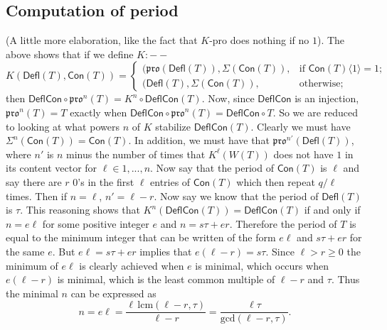 \documentclass[12pt]{amsart}
\theoremstyle{definition}
\theoremstyle{remark}
\numberwithin{equation}{section}
\newcommand{\pro}{\mathfrak{pro}}
\newcommand{\deflate}{\ensuremath{\mathsf{Defl}}}
\newcommand{\content}{\ensuremath{\mathsf{Con}}}
\newcommand{\compress}{\ensuremath{\mathsf{DeflCon}}}
\begin{document}
\subsection{Computation of period}\label{sec:period}
  (A little more elaboration, like the fact that $K$-pro does nothing if no $1$). The above shows that if we define $K: --$
\begin{dmath*}
K(\deflate(T),\content(T)) =
\begin{cases}
    (\pro(\deflate(T)),\Sigma(\content(T)),  & \text{if } \content(T)\langle 1 \rangle = 1; \\        
   (\deflate(T),\Sigma(\content(T)), & \text{otherwise;}
\end{cases}
\end{dmath*}
then $\compress \circ \pro^n(T) = K^n \circ \compress(T)$. Now, since $\compress$ is an injection, $\pro^n(T) = T$ exactly when $\compress \circ \pro^n(T) = \compress \circ T$. So we are reduced to looking at what powers $n$ of $K$ stabilize $\compress(T)$. 
Clearly we must have $\Sigma^n(\content(T)) = \content(T)$.  In addition, we must have that $\pro^{n'}(\deflate(T))$, where $n'$ is $n$ minus the number of times that $K^\ell(W(T))$ does not have $1$ in its content vector for $\ell \in 1,...,n$. 
Now say that the period of $\content(T)$ is $\ell$ and say there are $r$ $0$'s in the first $\ell$ entries of $\content(T)$ which then repeat $q/\ell$ times. Then if $n = \ell$, $n' = \ell - r$. Now say we know that the period of $\deflate(T)$ is $\tau$. This reasoning shows that $K^n (\compress(T)) = \compress(T)$ if and only if $n = e \ell$ for some positive integer $e$ and $n = s \tau + e  r$. Therefore the period of $T$ is equal to the minimum integer that can be written of the form $e \ell$ and $s \tau + e r$ for the same $e$. But $e \ell = s\tau + er$ implies that $e(\ell-r) = s\tau$. Since $\ell > r \geq 0$ the minimum of $e \ell$ is clearly achieved when $e$ is minimal, which occurs when $e(\ell-r)$ is minimal, which is the least common multiple of $\ell-r$ and $\tau$. Thus the minimal $n$ can be expressed as 
\begin{equation*}
n = e \ell = \frac{\ell \, \text{lcm}(\ell-r,\tau)}{\ell-r} = \frac{\ell \tau}{\text{gcd}(\ell-r,\tau)}. 
\end{equation*}
\end{document}
